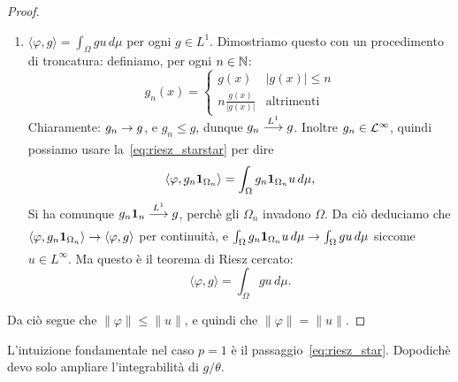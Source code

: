 \begin{proof}
\begin{enumerate}
		\item $\langle \varphi, g \rangle = \int_\Omega gu\,d\mu$ per ogni $g \in L^1$. Dimostriamo questo con un procedimento di troncatura: definiamo, per ogni $n \in \mathbb{N}$:
		\begin{equation*}
			g_n(x) = \begin{cases}
				g(x) & |g(x)| \leq n\\
				n \frac{g(x)}{|g(x)|} & \text{altrimenti}
			\end{cases}
		\end{equation*}
		Chiaramente: $g_n \underset{{}}{\rightarrow} g$, e $g_n \leq g$, dunque $g_n \overset{L^1}{\underset{{}}{\longrightarrow}} g$. Inoltre $g_n \in \mathcal{L}^\infty$, quindi possiamo usare la~\eqref{eq:riesz_starstar} per dire
		\begin{equation*}
			\langle \varphi, g_n {\boldsymbol{1}}_{\Omega_n} \rangle = \int_\Omega g_n {\boldsymbol{1}}_{\Omega_n} u \,d\mu,
		\end{equation*}
		Si ha comunque $g_n {\boldsymbol{1}}_n \overset{L^1}{\underset{{}}{\longrightarrow}} g$, perchè gli $\Omega_n$ invadono $\Omega$. Da ciò deduciamo che $\langle \varphi, g_n {\boldsymbol{1}}_{\Omega_n} \rangle \underset{{}}{\rightarrow} \langle \varphi, g \rangle$ per continuità, e $\int_\Omega  g_n {\boldsymbol{1}}_{\Omega_n} u \,d\mu \underset{{}}{\rightarrow} \int_\Omega g u \,d\mu$ siccome $u \in L^\infty$. Ma questo è il teorema di Riesz cercato:
		\begin{equation*}
			\langle \varphi, g \rangle = \int_\Omega gu\,d\mu.
		\end{equation*}
	\end{enumerate}
	Da ciò segue che $\|\varphi\| \leq \|u\|$, e quindi che $\|\varphi\|=\|u\|$.
\end{proof}

\begin{remark}
	L'intuizione fondamentale nel caso $p=1$ è il passaggio~\eqref{eq:riesz_star}. Dopodichè devo solo ampliare l'integrabilità di $g/\theta$.
\end{remark}

